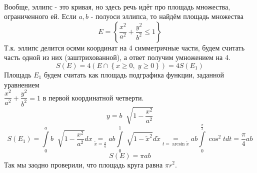 \documentclass[../main.tex]{subfiles}
\begin{document}
\begin{example}

    ~

    Вообще, эллипс - это кривая, но здесь речь идёт про площадь множества, ограниченного ей. Если \( a, b\) - полуоси эллипса, то найдём площадь множества 
    \[ E = \left\{ \dfrac{ x^2}{ a^2}+ \dfrac{ y^2}{ b^2} \leq 1\right\}\]
    Т.к. эллипс делится осями координат на 4 симметричные части, будем считать часть одной из них (заштрихованной), а ответ получим умножением на 4. 
    \[ S\left( E\right)=4\left( E \cap \left\{ x \geq 0, \;y \geq 0\right\}\right) = 4S(E_1)\]
    Площадь \(E_1\) будем считать как площадь подграфика функции, заданной уравнением \\
    \( \dfrac{ x^2}{ a^2}+ \dfrac{ y^2}{ b^2}=1\) в первой координатной четверти. 
    \[ y= b\;\sqrt[]{1- \dfrac{ x^2}{ a^2}}\]
    \[ S\left( E_1\right)= \displaystyle\int\limits_{ 0}^{ a} b \;\sqrt[]{1- \dfrac{ x^2}{ a^2}}dx \underset{\tilde{x}= \frac{ x}{ a}}{=} ab\displaystyle\int\limits_{ 0}^{ 1} \sqrt[]{1- \tilde{x}^2}d \tilde{x} \underset{ 
        t=\arcsin{ \tilde{x}}}{=} ab\displaystyle\int\limits_{ 0}^{ \frac{ \pi}{ 2}} \cos^2tdt= \dfrac{ \pi}{ 4}ab\]
    \[ S\left( E\right)= \pi ab\]
    Так мы заодно проверили, что площадь круга равна \( \pi r^2\).
\end{example}
\end{document}
